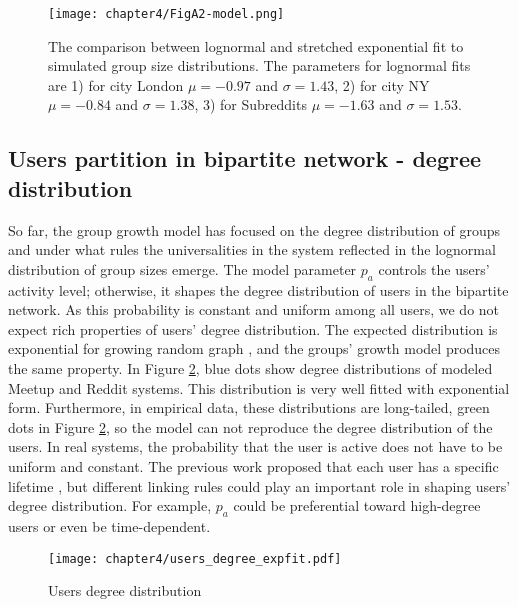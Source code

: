 \clearpage
\newpage
\begin{figure}[H]
	\centering
	\texttt{[image: chapter4/FigA2-model.png]}
	\caption[The fitting of simulated group size distributions.]{The comparison between lognormal and stretched exponential fit to simulated group size distributions. The parameters for lognormal fits are 1) for city London $\mu=-0.97$ and $\sigma = 1.43$, 2) for city NY $\mu=-0.84$ and $\sigma = 1.38$, 3) for Subreddits $\mu=-1.63$ and $\sigma = 1.53$. }
	\label{fig:fit_model}
\end{figure}


\subsection{Users partition in bipartite network - degree distribution}

So far, the group growth model has focused on the degree distribution of groups and under what rules the universalities in the system reflected in the lognormal distribution of group sizes emerge. The model parameter $p_a$ controls the users' activity level; otherwise, it shapes the degree distribution of users in the bipartite network. As this probability is constant and uniform among all users, we do not expect rich properties of users' degree distribution. The expected distribution is exponential for growing random graph \cite{barabasi1999mean}, and the groups' growth model produces the same property. In Figure \ref{fig:users_degree}, blue dots show degree distributions of modeled Meetup and Reddit systems. This distribution is very well fitted with exponential form.
Furthermore, in empirical data, these distributions are long-tailed, green dots in Figure \ref{fig:users_degree}, so the model can not reproduce the degree distribution of the users. In real systems, the probability that the user is active does not have to be uniform and constant. The previous work proposed that each user has a specific lifetime \cite{leskovec2008microscopic}, but different linking rules could play an important role in shaping users' degree distribution. For example, $p_a$ could be preferential toward high-degree users or even be time-dependent.

\begin{figure}[h]
	\centering
	\texttt{[image: chapter4/users\_degree\_expfit.pdf]}
	\caption[Users degree distribution]{Users degree distribution}
	\label{fig:users_degree}
\end{figure}


